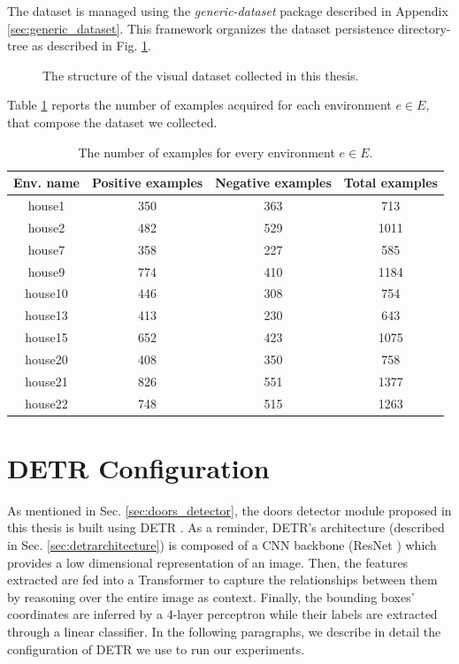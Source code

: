 The dataset is managed using the \textit{generic-dataset} package described in Appendix \ref{sec:generic_dataset}. This framework organizes the dataset persistence directory-tree as described in Fig. \ref{fig:organization_dataset}.

\begin{figure}[h!]
	\centering
	\begin{minipage}{7cm}
	\end{minipage}
	\caption{The structure of the visual dataset collected in this thesis.}
	\label{fig:organization_dataset}
\end{figure} 

Table \ref{tab:dataset_examples_number} reports the number of examples acquired for each environment $e \in E$, that compose the dataset we collected.

\begin{table}[h!]
	\centering
	\begin{tabular}{cccc}

	\toprule
	\textbf{Env. name} & \textbf{Positive examples} & \textbf{Negative examples} & \textbf{Total
		examples}\tabularnewline
	\midrule
	house1 & 350 & 363 & 713\tabularnewline
	house2 & 482 & 529 & 1011\tabularnewline
	house7 & 358 & 227 & 585\tabularnewline
	house9 & 774 & 410 & 1184\tabularnewline
	house10 & 446 & 308 & 754\tabularnewline
	house13 & 413 & 230 & 643\tabularnewline
	house15 & 652 & 423 & 1075\tabularnewline
	house20 & 408 & 350 & 758\tabularnewline
	house21 & 826 & 551 & 1377\tabularnewline
	house22 & 748 & 515 & 1263\tabularnewline
	\bottomrule
	\end{tabular}
	\caption{The number of examples for every environment $e \in E$.}
	\label{tab:dataset_examples_number}
\end{table}
\newpage
\section{DETR Configuration}

As mentioned in Sec. \ref{sec:doors_detector}, the doors detector module proposed in this thesis is built using DETR \cite{detr}. As a reminder, DETR's architecture (described in Sec. \ref{sec:detrarchitecture}) is composed of a CNN backbone (ResNet \cite{resnet}) which  provides a low dimensional representation of an image. Then, the features extracted are fed into a Transformer \cite{transformer} to capture the relationships between them by reasoning over the entire image as context. Finally, the bounding boxes' coordinates are inferred by a 4-layer perceptron while their labels are extracted through a linear classifier. In the following paragraphs, we describe in detail the configuration of DETR we use to run our experiments.

